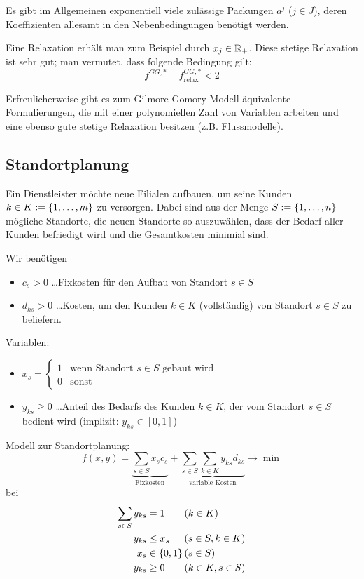 \begin{description}
	Es gibt im Allgemeinen exponentiell viele zulässige Packungen $a^j$ ($j \in J$), deren Koeffizienten allesamt in den Nebenbedingungen benötigt werden.
	
	Eine Relaxation erhält man zum Beispiel durch $x_j \in \mathbb{R}_+$. Diese stetige Relaxation ist sehr gut; man vermutet, dass folgende Bedingung gilt:
	\begin{equation*}
		f^{GG, \ast} - f^{GG, \ast}_\text{relax} < 2
	\end{equation*}
\end{description}

Erfreulicherweise gibt es zum Gilmore-Gomory-Modell äquivalente Formulierungen, die mit einer polynomiellen Zahl von Variablen arbeiten und eine ebenso gute stetige Relaxation besitzen (z.B. Flussmodelle).


\subsection{Standortplanung}
Ein Dienstleister möchte neue Filialen aufbauen, um seine Kunden $k \in K \mathrel{:=} \left\{ 1, \dots , m \right\}$ zu versorgen. Dabei sind aus der Menge $S \mathrel{:=} \left\{ 1, \dots , n \right\}$ mögliche Standorte, die neuen Standorte so auszuwählen, dass der Bedarf aller Kunden befriedigt wird und die Gesamtkosten minimial sind.

Wir benötigen
\begin{itemize}[nolistsep, topsep=-\parskip]
	\item $c_s > 0$ \dots Fixkosten für den Aufbau von Standort $s \in S$
	\item $d_{ks} > 0$ \dots Kosten, um den Kunden $k \in K$ (vollständig) von Standort $s \in S$ zu beliefern.
\end{itemize}

Variablen:
\begin{itemize}[nolistsep, topsep=-\parskip]
	\item $x_s = \begin{cases} 1 & \text{wenn Standort } s \in S \text{ gebaut wird} \\ 0 & \text{sonst} \end{cases}$ 
	\item $y_{ks} \ge 0$ \dots Anteil des Bedarfs des Kunden $k \in K$, der vom Standort $s \in S$ bedient wird (implizit: $y_{ks} \in [0,1]$)
\end{itemize}

Modell zur Standortplanung:
\begin{equation*}
	f(x,y) = \underbrace{\sum_{s \in S} x_s c_s}_{\text{Fixkosten}}  + \underbrace{\sum_{s \in S} \sum_{k \in K} y_{ks} d_{ks}}_{\text{variable Kosten}} \to \min
\end{equation*}
bei
\begin{equation*}
\begin{alignedat}{2}
	\sum_{s \in S} y_{ks} &= 1 &&(k \in K) \\
	y_{ks} &\le x_s &&(s \in S, k \in K) \\
	x_s &\in \left\{ 0,1 \right\}  &&(s \in S) \\
	y_{ks} &\ge 0\qquad &&(k \in K, s \in S)
\end{alignedat}
\end{equation*}

